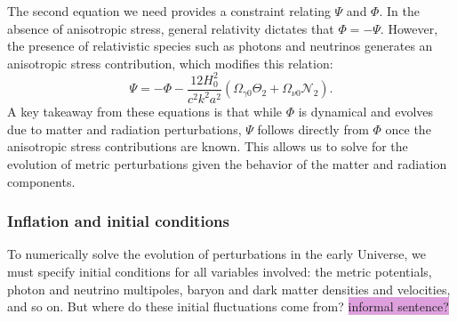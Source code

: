 \documentclass{aa}
\numberwithin{equation}{section}
\numberwithin{table}{section}
\numberwithin{figure}{section}
\begin{document}
The second equation we need provides a constraint relating $\Psi$ and $\Phi$. In the absence of anisotropic stress, general relativity dictates that $\Phi = -\Psi$. However, the presence of relativistic species such as photons and neutrinos generates an anisotropic stress contribution, which modifies this relation:
\begin{equation}
\Psi = -\Phi - \frac{12 H_0^2}{c^2 k^2 a^2} \left( \Omega_{\gamma0} \Theta_2 + \Omega_{\nu0} \mathcal{N}_2 \right).
\end{equation}
A key takeaway from these equations is that while $\Phi$ is dynamical and evolves due to matter and radiation perturbations, $\Psi$ follows directly from $\Phi$ once the anisotropic stress contributions are known. This allows us to solve for the evolution of metric perturbations given the behavior of the matter and radiation components. 





\subsubsection{Inflation and initial conditions}\label{subsubsec: III theory inflation}
To numerically solve the evolution of perturbations in the early Universe, we must specify initial conditions for all variables involved: the metric potentials, photon and neutrino multipoles, baryon and dark matter densities and velocities, and so on. But where do these initial fluctuations come from? \colorbox{Plum}{informal sentence?}
\end{document}
